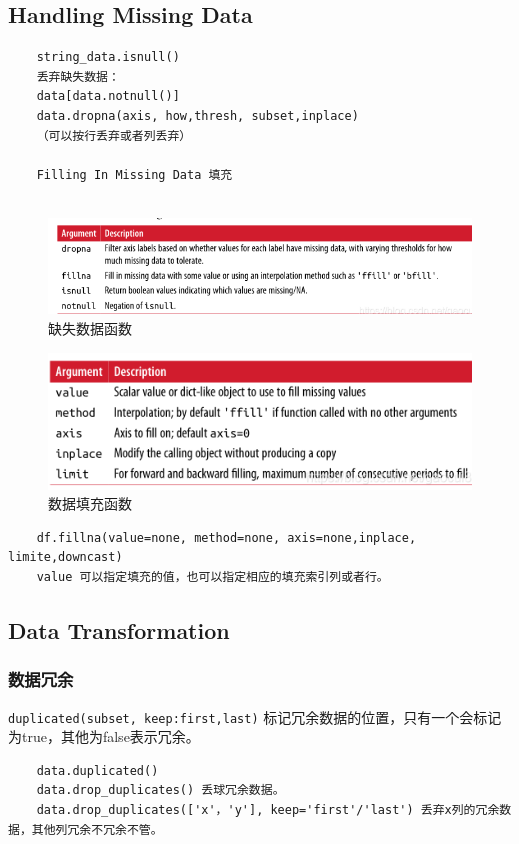 \documentclass{article}
\begin{document}
\subsection[数据缺失处理]{Handling Missing Data}
\begin{lstlisting}
	string_data.isnull()
	丢弃缺失数据：
	data[data.notnull()]
	data.dropna(axis, how,thresh, subset,inplace)
	（可以按行丢弃或者列丢弃）
	
	Filling In Missing Data 填充
	
\end{lstlisting}
\begin{figure}[htpb]
	\centering
	\includegraphics[width=\linewidth]{fig/na1}
	\caption{缺失数据函数}
	\label{fig-missingdata}
\end{figure}
\begin{figure}
	\centering
	\includegraphics[width=\linewidth]{fig/na2}
	\caption{数据填充函数}
	\label{fig-fillna}
\end{figure}

\begin{lstlisting}
	df.fillna(value=none, method=none, axis=none,inplace, limite,downcast)
	value 可以指定填充的值，也可以指定相应的填充索引列或者行。
\end{lstlisting}

\subsection{Data Transformation}
\subsubsection{数据冗余}
\verb|duplicated(subset, keep:first,last)|  标记冗余数据的位置，只有一个会标记为true，其他为false表示冗余。
\begin{lstlisting}
	data.duplicated()
	data.drop_duplicates() 丢球冗余数据。
	data.drop_duplicates(['x'，'y'], keep='first'/'last') 丢弃x列的冗余数据，其他列冗余不冗余不管。
	
\end{lstlisting}
\end{document}

